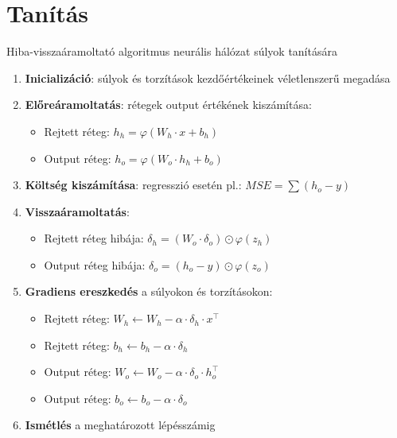 \documentclass[english, aspectratio=169]{beamer}
\makeatletter
\let\origtableofcontents=\tableofcontents
\def\tableofcontents{\@ifnextchar[{\origtableofcontents}{\gobbletableofcontents}}
\def\gobbletableofcontents#1{\origtableofcontents}
\makeatother
\begin{document}
\section{Tanítás}

\begin{frame}
\tableofcontents[currentsection]
\end{frame}

\begin{frame}{Hiba-visszaáramoltató algoritmus neurális hálózat súlyok tanítására}
\begin{enumerate}
	\item \textbf{Inicializáció}: súlyok és torzítások kezdőértékeinek véletlenszerű megadása
	\item \textbf{Előreáramoltatás}: rétegek output értékének kiszámítása: 
	\begin{itemize}
		\item Rejtett réteg: $h_h = \varphi(W_h \cdot x + b_h)$
		\item Output réteg: $h_o = \varphi(W_o \cdot h_h + b_o)$
	\end{itemize}
	\item \textbf{Költség kiszámítása}: regresszió esetén pl.: $MSE = \sum \left( h_o - y \right)$
	\item \textbf{Visszaáramoltatás}: 
	\begin{itemize}
		\item Rejtett réteg hibája: $\delta_h=(W_o \cdot \delta_o) \odot \varphi(z_h)$
		\item Output réteg hibája: $\delta_o=(h_o - y) \odot \varphi(z_o)$
	\end{itemize}
	\item \textbf{Gradiens ereszkedés} a súlyokon és torzításokon:
	\begin{itemize}
		\item Rejtett réteg: $W_h \leftarrow W_h - \alpha \cdot \delta_h \cdot x^\top$
		\item Rejtett réteg: $b_h \leftarrow b_h - \alpha \cdot \delta_h$	
		\item Output réteg: $W_o \leftarrow W_o - \alpha \cdot \delta_o \cdot h_o^\top$
		\item Output réteg: $b_o \leftarrow b_o - \alpha \cdot \delta_o$

	\end{itemize}
	\item \textbf{Ismétlés} a meghatározott lépésszámig
\end{enumerate}
\end{frame}
\end{document}

